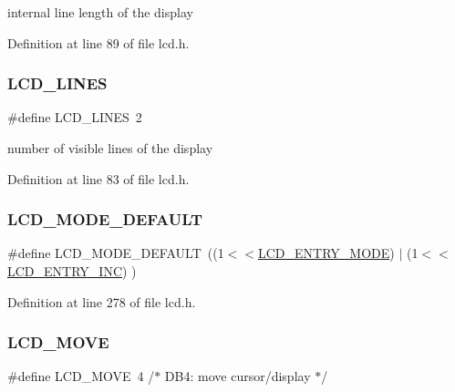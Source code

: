 internal line length of the display 

Definition at line 89 of file lcd.\+h.

\mbox{\label{group__pfleury__lcd_ga01212e90283511562039db786f65ba98}} 
\subsubsection{\texorpdfstring{LCD\_LINES}{LCD\_LINES}}
{\footnotesize\ttfamily \#define L\+C\+D\+\_\+\+L\+I\+N\+ES~2}

number of visible lines of the display 

Definition at line 83 of file lcd.\+h.

\mbox{\label{group__pfleury__lcd_ga1849e2087d3034a3fffa67444beed109}} 
\subsubsection{\texorpdfstring{LCD\_MODE\_DEFAULT}{LCD\_MODE\_DEFAULT}}
{\footnotesize\ttfamily \#define L\+C\+D\+\_\+\+M\+O\+D\+E\+\_\+\+D\+E\+F\+A\+U\+LT~((1$<$$<$\mbox{\hyperlink{group__pfleury__lcd_gae5d757ddb6d94de8c82191b60b40e442}{L\+C\+D\+\_\+\+E\+N\+T\+R\+Y\+\_\+\+M\+O\+DE}}) $\vert$ (1$<$$<$\mbox{\hyperlink{group__pfleury__lcd_gada766266a0be0d0040fbf86e23b58aa6}{L\+C\+D\+\_\+\+E\+N\+T\+R\+Y\+\_\+\+I\+NC}}) )}



Definition at line 278 of file lcd.\+h.

\mbox{\label{group__pfleury__lcd_ga3f4f758b80fcfa6c9e4db58e2515c78a}} 
\subsubsection{\texorpdfstring{LCD\_MOVE}{LCD\_MOVE}}
{\footnotesize\ttfamily \#define L\+C\+D\+\_\+\+M\+O\+VE~4      /$\ast$ D\+B4\+: move cursor/display            $\ast$/}



